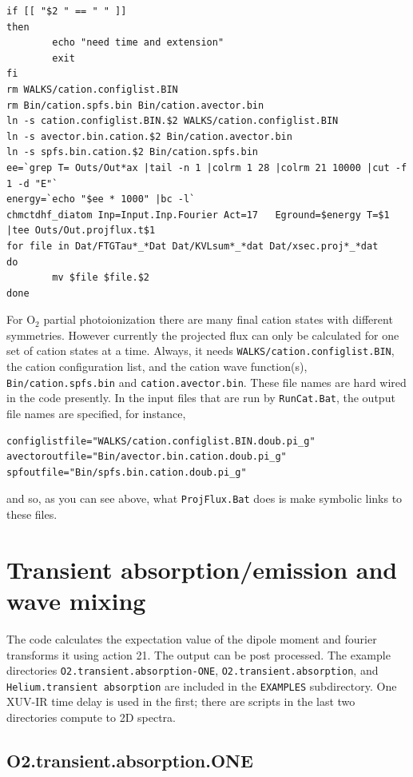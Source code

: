 \documentclass[10pt,leqno, oneside]{book}
\begin{document}
{\footnotesize
\begin{verbatim}
if [[ "$2 " == " " ]]
then
        echo "need time and extension"
        exit
fi
rm WALKS/cation.configlist.BIN
rm Bin/cation.spfs.bin Bin/cation.avector.bin
ln -s cation.configlist.BIN.$2 WALKS/cation.configlist.BIN
ln -s avector.bin.cation.$2 Bin/cation.avector.bin
ln -s spfs.bin.cation.$2 Bin/cation.spfs.bin
ee=`grep T= Outs/Out*ax |tail -n 1 |colrm 1 28 |colrm 21 10000 |cut -f 1 -d "E"`
energy=`echo "$ee * 1000" |bc -l`
chmctdhf_diatom Inp=Input.Inp.Fourier Act=17   Eground=$energy T=$1 |tee Outs/Out.projflux.t$1
for file in Dat/FTGTau*_*Dat Dat/KVLsum*_*dat Dat/xsec.proj*_*dat
do
        mv $file $file.$2
done
\end{verbatim}
}
For O$_2$ partial photoionization there are many final cation states with different symmetries.  
However currently the projected flux can only be calculated
for one set of cation states at a time.  Always, it needs \verb#WALKS/cation.configlist.BIN#, the cation 
configuration list, and the cation wave function(s), \verb#Bin/cation.spfs.bin# and \verb#cation.avector.bin#.
These file names are hard wired in the code presently.  
In the input files that are run by \verb#RunCat.Bat#, the output file names are specified, for instance,
{\footnotesize
\begin{verbatim}
configlistfile="WALKS/cation.configlist.BIN.doub.pi_g"
avectoroutfile="Bin/avector.bin.cation.doub.pi_g"
spfoutfile="Bin/spfs.bin.cation.doub.pi_g"
\end{verbatim}
}
and so, as you can see above, what \verb#ProjFlux.Bat# does is make symbolic links to these files.




\section{Transient absorption/emission and wave mixing}

The code calculates the expectation value of the dipole moment and fourier transforms it using action 21.  The output can be post
processed.  The example directories 
\verb#O2.transient.absorption-ONE#,
\verb#O2.transient.absorption#, and
\verb#Helium.transient absorption#
are included in the \verb#EXAMPLES# subdirectory.  One XUV-IR time delay is used in the first; there are scripts in
the last two directories compute to 2D spectra.  

\subsection{O2.transient.absorption.ONE}
\end{document}
